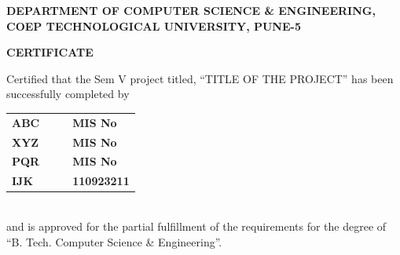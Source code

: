% 
\thispagestyle{empty}
\linespread{2}
\begin{center}			%
	\large{\bf{DEPARTMENT OF COMPUTER SCIENCE \& ENGINEERING,\\ 
	      COEP TECHNOLOGICAL UNIVERSITY, PUNE-5\\}}	
\end{center}

\vspace{20pt}			%

\begin{center}
	\Large{\bf{CERTIFICATE\\}}
\end{center}

\vspace{20pt}

\linespread{1.5}			%
\selectfont
\large{
Certified that the Sem V project titled, ``TITLE OF THE PROJECT''
has been successfully completed by \\ 
\begin{table}[htbp]
	\begin{center}
	\begin{tabular}{ l c c l }
	\Large\bf{ABC} & & & \Large\bf{MIS No} \\ [0.3cm]
	\Large\bf{XYZ} & & & \Large\bf{MIS No} \\ [0.3cm]
	\Large\bf{PQR} & & & \Large\bf{MIS No} \\ [0.3cm]
	\Large\bf{IJK} & & & \Large\bf{110923211}
	\end{tabular}
	\end{center}
	\end{table} \\
and is approved for the partial fulfillment of the requirements for the degree of 
``B. Tech. Computer Science \& Engineering''.
}

\vspace{60pt}

